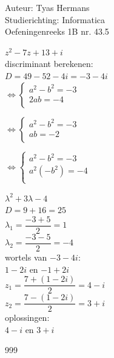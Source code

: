 \documentclass[a4paper]{article}
\begin{document}
  
\noindent \large Auteur: Tyas Hermans \\
\noindent \large Studierichting: Informatica\\
\noindent \large Oefeningenreeks 1B nr. 43.5\\

\medskip

\normalsize

$z^2 - 7z + 13 + i$\\

discriminant berekenen:\\

$D = 49 - 52 - 4i = -3-4i$\\

$\Leftrightarrow \left \{
\begin{array}{l}
    a^2 - b^2 = -3 \\
    2ab = -4 \\
\end{array}
\right .$

\medskip

$\Leftrightarrow \left \{
\begin{array}{l}
    a^2 - b^2 = -3 \\
    ab = -2 \\
\end{array}
\right .$

\medskip

$\Leftrightarrow \left \{
\begin{array}{l}
    a^2 - b^2 = -3 \\
    a^2(-b^2) = -4 \\
\end{array}
\right .$

\medskip

$\lambda^2 + 3\lambda - 4$\\

$D = 9+16 = 25$\\

$\lambda_1 = \dfrac{-3+5}{2} = 1$\\

$\lambda_2 = \dfrac{-3-5}{2} = -4$\\

wortels van $-3-4i$:\\

$1-2i$ en $-1+2i$\\

$z_1 = \dfrac{7+(1-2i)}{2} = 4-i$\\

$z_2 = \dfrac{7-(1-2i)}{2} = 3+i$\\

oplossingen: \\

$4-i$ en $3+i$\\






\begin{thebibliography}{999}
\end{thebibliography}
\end{document}
